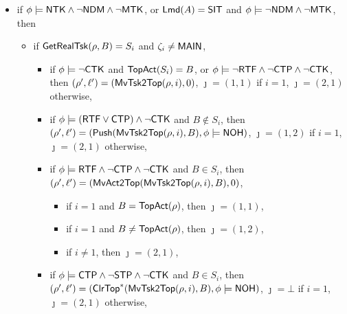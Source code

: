 {\begin{itemize}
\begin{itemize}
\begin{itemize}
			\begin{itemize}
				\item if $i = 1$ and $B = \topact(\rho)$, then $\jmath = (1,1)$,
				\item if $i = 1$ and $B \neq \topact(\rho)$, then $\jmath = \bot$,
				\item if $i \neq 1$, then $\jmath = (2,1)$,
			\end{itemize}
            \item if $\phi\models\ctkflag$, then $(\rho',\ell') = (\clrtsk(\mvtsktop(\rho,i),B),\phi\models\nohflag)$, $\jmath = \bot$ if $i = 1$, $\jmath = (2,1)$ otherwise,
        \end{itemize}
        \item if $\getrealtsk(\rho,B) = *$, then $(\rho',\ell') = (\newtsk(\rho, B, \ndmflag),\phi\models\nohflag)$, $\jmath = (2,1)$,
    \end{itemize}
	\item if $\phi \models {\sf NTK}\wedge \neg{\sf NDM}\wedge \neg {\sf MTK}$, or ${\sf Lmd}(A) = {\sf SIT}$ and $\phi  \models \neg{\sf NDM}\wedge \neg {\sf MTK}$, then
	\begin{itemize}
        \item if $\mathsf{GetRealTsk}(\rho, B) = S_i$ and $\zeta_i\neq{\sf MAIN}$,
            \begin{itemize}
            \item if $\phi\models\neg{\sf CTK}$ and $\mathsf{TopAct}(S_i) = B$, 
                or $\phi\models\neg{\sf RTF}\wedge\neg{\sf CTP}\wedge\neg{\sf CTK}$,
                then $(\rho',\ell')=(\mathsf{MvTsk2Top}(\rho, i), 0)$, $\jmath = (1,1)$ if $i = 1$, $\jmath = (2,1)$ otherwise,
            \item if $\phi\models({\sf RTF}\vee{\sf CTP})\wedge\neg{\sf CTK}$ and $B\notin S_i$,
				then $(\rho',\ell')=(\mathsf{Push}(\mathsf{MvTsk2Top}(\rho, i), B),\phi\models{\sf NOH})$, $\jmath = (1,2)$ if $i = 1$, $\jmath = (2,1)$ otherwise,
            \item if $\phi \models {\sf RTF} \wedge \neg {\sf CTP}\wedge\neg{\sf CTK}$ and $B \in S_i$,
			then $(\rho',\ell')=(\mathsf{MvAct2Top}(\mathsf{MvTsk2Top}(\rho, i), B),0)$,
			\begin{itemize}
				\item if $i = 1$ and $B = \topact(\rho)$, then $\jmath = (1,1)$,
				\item if $i = 1$ and $B \neq \topact(\rho)$, then $\jmath = (1,2)$,
				\item if $i \neq 1$, then $\jmath = (2,1)$,
			\end{itemize}
            \item if $\phi \models{\sf CTP}\wedge\neg{\sf STP}\wedge\neg{\sf CTK}$ and $B \in S_i$, then $(\rho',\ell') =(\mathsf{ClrTop}^*(\mathsf{MvTsk2Top}(\rho, i), B), \phi\models{\sf NOH})$, $\jmath = \bot$ if $i = 1$, $\jmath = (2,1)$ otherwise,

\end{itemize}
\end{itemize}
\end{itemize}}

